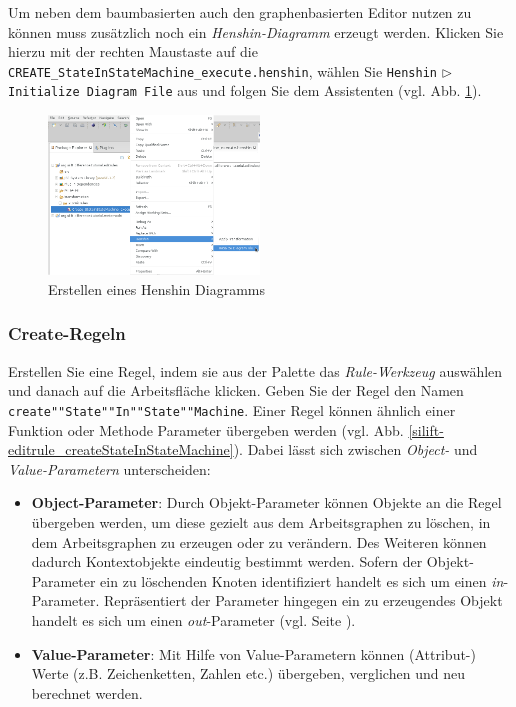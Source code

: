 Um neben dem baumbasierten auch den graphenbasierten Editor nutzen zu können muss zusätzlich noch ein \textit{Henshin-Diagramm} erzeugt werden.
Klicken Sie hierzu mit der rechten Maustaste auf die \texttt{CREATE\_StateInStateMachine\_execute.henshin}, wählen Sie \texttt{Henshin} $\triangleright$ \texttt{Initialize Diagram File} aus und folgen Sie dem Assistenten (vgl. Abb. \ref{henshin-initialize_henshin_diagram}).

\begin{figure}[H]
\centering
\includegraphics[width=0.5\textwidth]{editrules/graphics/henshin-initialize_henshin_diagram.png}
\caption{Erstellen eines Henshin Diagramms}
\label{henshin-initialize_henshin_diagram}
\end{figure}

\subsubsection*{Create-Regeln}

Erstellen Sie eine Regel, indem sie aus der Palette das \textit{Rule-Werkzeug} auswählen und danach auf die Arbeitsfläche klicken. Geben Sie der Regel den Namen \texttt{create""State""In""State""Machine}.
Einer Regel können ähnlich einer Funktion oder Methode Parameter übergeben werden (vgl. Abb. \ref{silift-editrule_createStateInStateMachine}).
Dabei lässt sich zwischen \textit{Object-} und \textit{Value-Parametern} unterscheiden:

\begin{itemize}

\item \textbf{Object-Parameter}: 
Durch Objekt-Parameter können Objekte an die Regel über\-ge\-ben werden, um diese gezielt aus dem Arbeitsgraphen zu löschen, in dem Arbeitsgraphen zu erzeugen oder zu verändern.
Des Weiteren können dadurch Kontextobjekte eindeutig bestimmt werden. 
Sofern der Objekt-Parameter ein zu löschenden Knoten identifiziert handelt es sich um einen \textit{in}-Parameter.
Repräsentiert der Parameter hingegen ein zu erzeugendes Objekt handelt es sich um einen \textit{out}-Parameter (vgl. Seite \pageref{in/out_parameter}).

\item \textbf{Value-Parameter}: Mit Hilfe von Value-Parametern können (Attribut-) Werte (z.B. Zeichenketten, Zahlen etc.) übergeben, verglichen und neu berechnet werden.
\end{itemize}

